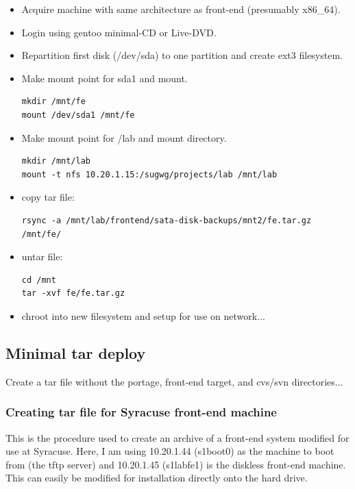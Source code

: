 \begin{itemize}
    \item Acquire machine with same architecture as front-end (presumably x86\_64).
    \item Login using gentoo minimal-CD or Live-DVD.
    \item Repartition first disk (/dev/sda) to one partition and create ext3 filesystem.
    \item Make mount point for sda1 and mount.
%
\begin{lstlisting}
mkdir /mnt/fe
mount /dev/sda1 /mnt/fe
\end{lstlisting}
%
    \item Make mount point for /lab and mount directory.

\begin{lstlisting}
mkdir /mnt/lab
mount -t nfs 10.20.1.15:/sugwg/projects/lab /mnt/lab
\end{lstlisting}

    \item copy tar file:

\begin{lstlisting}
rsync -a /mnt/lab/frontend/sata-disk-backups/mnt2/fe.tar.gz /mnt/fe/
\end{lstlisting}

    \item untar file:

\begin{lstlisting}
cd /mnt
tar -xvf fe/fe.tar.gz
\end{lstlisting}

    \item chroot into new filesystem and setup for use on network...
\end{itemize}


\subsection{Minimal tar deploy}

Create a tar file without the portage, front-end target, and cvs/svn directories...

\subsubsection{Creating tar file for Syracuse front-end machine}

This is the procedure used to create an archive of a front-end system modified for use at Syracuse. Here, I am using 10.20.1.44 (s1boot0) as the machine to boot from (the tftp server) and 10.20.1.45 (s1labfe1) is the diskless front-end machine. This can easily be modified for installation directly onto the hard drive.

